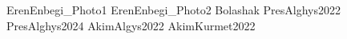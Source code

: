 \renewcommand\ExhibitGroup{Awards}


{ErenEnbegi_Photo1}
{ErenEnbegi_Photo2}
{Bolashak}
{PresAlghys2022}
{PresAlghys2024}
{AkimAlgys2022}
{AkimKurmet2022}
